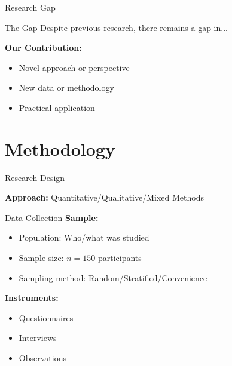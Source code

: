 \documentclass[aspectratio=169]{beamer}
\begin{document}
	\begin{frame}{Research Gap}
		\begin{alertblock}{The Gap}
			Despite previous research, there remains a gap in...
		\end{alertblock}
		
		\vspace{1em}
		
		\textbf{Our Contribution:}
		\begin{itemize}
			\item Novel approach or perspective
			\item New data or methodology
			\item Practical application
		\end{itemize}
	\end{frame}
	
	\section{Methodology}
	
	\begin{frame}{Research Design}
		\begin{center}
		\end{center}
		
		\vspace{1em}
		
		\textbf{Approach:} Quantitative/Qualitative/Mixed Methods
	\end{frame}
	
	\begin{frame}{Data Collection}
		\textbf{Sample:}
		\begin{itemize}
			\item Population: Who/what was studied
			\item Sample size: $n = 150$ participants
			\item Sampling method: Random/Stratified/Convenience
		\end{itemize}
		
		\vspace{1em}
		
		\textbf{Instruments:}
		\begin{itemize}
			\item Questionnaires
			\item Interviews
			\item Observations
		\end{itemize}
	\end{frame}
	
\end{document}
